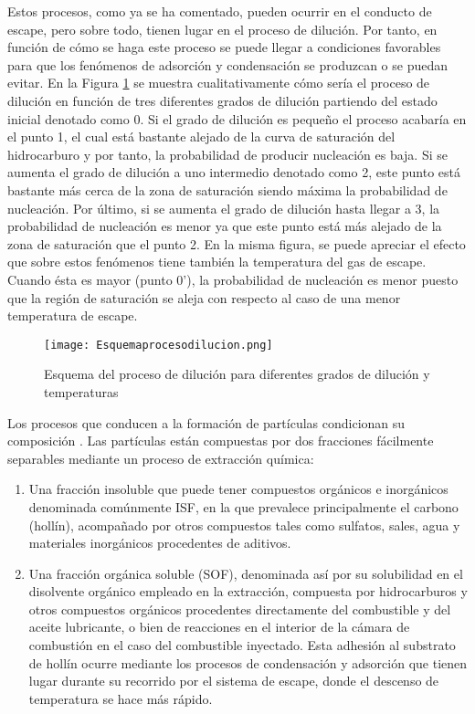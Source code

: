 \par Estos procesos, como ya se ha comentado, pueden ocurrir en el conducto de escape, pero sobre todo, tienen lugar en el proceso de dilución. Por tanto, en función de cómo se haga este proceso se puede llegar a condiciones favorables para que los fenómenos de adsorción y condensación se produzcan o se puedan evitar. En la Figura \ref{fig:esquemaprocesodilucion} se muestra cualitativamente cómo sería el proceso de dilución en función de tres diferentes grados de dilución partiendo del estado inicial denotado como 0. Si el grado de dilución es pequeño el proceso acabaría en el punto 1, el cual está bastante alejado de la curva de saturación del hidrocarburo y por tanto, la probabilidad de producir nucleación es baja. Si se aumenta el grado de dilución a uno intermedio denotado como 2, este punto está bastante más cerca de la zona de saturación siendo máxima la probabilidad de nucleación. Por último, si se aumenta el grado de dilución hasta llegar a 3, la probabilidad de nucleación es menor ya que este punto está más alejado de la zona de saturación que el punto 2. En la misma figura, se puede apreciar el efecto que sobre estos fenómenos tiene también la temperatura del gas de escape. Cuando ésta es mayor (punto 0'), la probabilidad de nucleación es menor puesto que la región de saturación se aleja con respecto al caso de una menor temperatura de escape. 

\begin{figure}[ht]
\centering
	\texttt{[image: Esquemaprocesodilucion.png]}	 
	\caption{Esquema del proceso de dilución para diferentes grados de dilución y temperaturas} \label{fig:esquemaprocesodilucion}
\end{figure} 

\par Los procesos que conducen a la formación de partículas condicionan su composición \cite{smith:1982}. Las partículas están compuestas por dos fracciones fácilmente separables mediante un proceso de extracción química:

\begin{enumerate}
\item Una fracción insoluble que puede tener compuestos orgánicos e inorgánicos denominada comúnmente ISF, en la que prevalece principalmente el carbono (hollín), acompañado por otros compuestos tales como sulfatos, sales, agua y materiales inorgánicos procedentes de aditivos.
\item Una fracción orgánica soluble (SOF), denominada así por su solubilidad en el disolvente orgánico empleado en la extracción, compuesta por hidrocarburos y otros compuestos orgánicos procedentes directamente del combustible  y del aceite lubricante, o bien de reacciones en el interior de la cámara de combustión en el caso del combustible inyectado. Esta adhesión al substrato de hollín ocurre mediante los procesos de condensación y adsorción que tienen lugar durante su recorrido por el sistema de escape, donde el descenso de temperatura se hace más rápido.
\end{enumerate}

